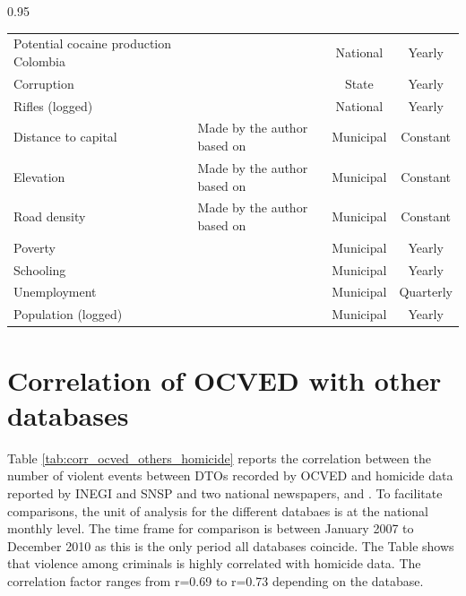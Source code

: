 \documentclass[12pt,letterpaper]{article}
\begin{document}
\begin{table}[h!]
\begin{spacing}{0.95}
\begin{tabular}{p{4.5cm} p{6.5cm}cc}
Potential cocaine production Colombia	&	 \citet{UnitedNationsOfficeonDrugsandCrime2006,UnitedNationsOfficeonDrugsandCrime2013b} 	&	National	&	Yearly	 \\	
Corruption	&	 \citet{TransparenciaMexicana2012} 	&	State	&	Yearly	 \\	
Rifles (logged)	&	 \citet{BureauofAlchoholTobacco2012} 	&	National	&	Yearly	 \\	
Distance to capital	&	 Made by the author based on \citet{INEGI2014} 	&	Municipal	&	Constant	 \\	
Elevation	&	 Made by the author based on \citet{INEGI2014} 	&	Municipal	&	Constant	 \\	
Road density	&	 Made by the author based on \citet{INEGI2014} 	&	Municipal	&	Constant  \\	
Poverty	&	 \citet{CONEVAL2010} 	&	Municipal	&	Yearly	 \\	
Schooling	&	 \citet{INEGI2011} 	&	Municipal	&	Yearly	 \\	
Unemployment	&	 \citet{INEGI2011} 	&	Municipal	&	Quarterly	 \\	
Population (logged)	&	 \citet{INEGI2011} 	&	Municipal	&	Yearly	 \\	
\hline
\end{tabular}
\end{spacing}
\end{table}





\clearpage

\section{Correlation of OCVED with other databases}


Table \ref{tab:corr_ocved_others_homicide} reports the correlation between the number of violent events between DTOs recorded by OCVED and homicide data reported by INEGI and SNSP \citep{INEGI2013,PresidenciaDeLaRepublica2011} and two national newspapers, \citet{Reforma2014} and \citet{Milenio2014}. To facilitate comparisons, the unit of analysis for the different databaes is at the national monthly level. The time frame for comparison is between January 2007 to December 2010 as this is the only period all databases coincide.  The Table shows that violence among criminals is highly correlated with homicide data. The correlation factor ranges from r=0.69 to r=0.73 depending on the database.  
\end{document}
